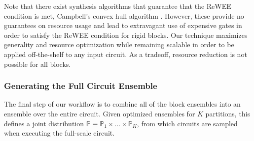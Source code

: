 Note that there exist synthesis algorithms that guarantee that the ReWEE condition is met, \eg Campbell's convex hull algorithm \cite{PhysRevA.95.042306}. However, these provide no guarantees on resource usage and lead to extravagant use of expensive gates in order to satisfy the ReWEE condition for rigid blocks. Our technique maximizes generality and resource optimization while remaining scalable in order to be applied off-the-shelf to any input circuit. As a tradeoff, resource reduction is not possible for all blocks.

\subsubsection*{Generating the Full Circuit Ensemble}
The final step of our workflow is to combine all of the block ensembles into an ensemble over the entire circuit. 
Given optimized ensembles for $K$ partitions, this defines a joint distribution $\mathbb{P} \equiv \mathbb{P}_1 \times ... \times \mathbb{P}_K$, from which circuits are sampled when executing the full-scale circuit. 

